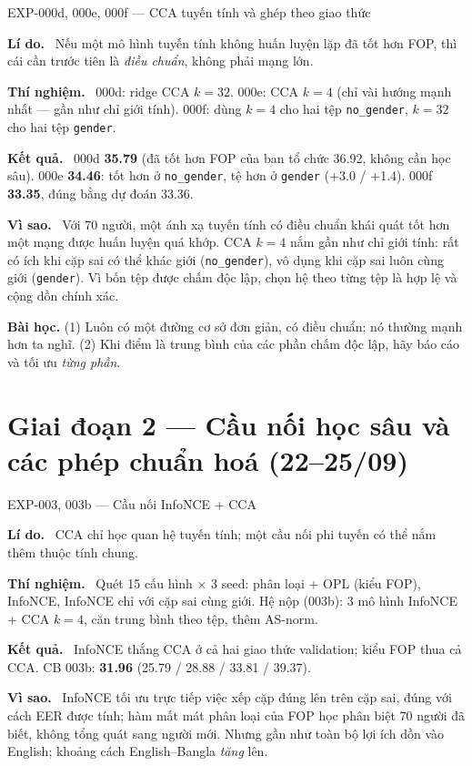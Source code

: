 \documentclass[11pt,a4paper,oneside]{report}
\newcommand{\up}[1]{\textbf{\color{good}#1}}
\newcommand{\id}[1]{\texttt{#1}}
\newcommand{\field}[1]{\par\smallskip\textbf{\color{accent}#1.}~}
\begin{document}
\begin{expbox}{EXP-000d, 000e, 000f --- CCA tuyến tính và ghép theo giao thức}
\field{Lí do} Nếu một mô hình tuyến tính không huấn luyện lặp đã tốt hơn FOP, thì cái cần trước tiên là \emph{điều chuẩn}, không phải mạng lớn.
\field{Thí nghiệm} 000d: ridge CCA $k=32$. 000e: CCA $k=4$ (chỉ vài hướng mạnh nhất --- gần như chỉ giới tính). 000f: dùng $k=4$ cho hai tệp \id{no\_gender}, $k=32$ cho hai tệp \id{gender}.
\field{Kết quả} 000d \up{35.79} (đã tốt hơn FOP của ban tổ chức 36.92, không cần học sâu). 000e \up{34.46}: tốt hơn ở \id{no\_gender}, tệ hơn ở \id{gender} (+3.0 / +1.4). 000f \up{33.35}, đúng bằng dự đoán 33.36.
\field{Vì sao} Với 70 người, một ánh xạ tuyến tính có điều chuẩn khái quát tốt hơn một mạng được huấn luyện quá khớp. CCA $k=4$ nắm gần như chỉ giới tính: rất có ích khi cặp sai có thể khác giới (\id{no\_gender}), vô dụng khi cặp sai luôn cùng giới (\id{gender}). Vì bốn tệp được chấm độc lập, chọn hệ theo từng tệp là hợp lệ và cộng dồn chính xác.
\end{expbox}

\begin{lesson}
\textbf{Bài học.} (1) Luôn có một đường cơ sở đơn giản, có điều chuẩn; nó thường mạnh hơn ta nghĩ. (2) Khi điểm là trung bình của các phần chấm độc lập, hãy báo cáo và tối ưu \emph{từng phần}.
\end{lesson}

\section{Giai đoạn 2 --- Cầu nối học sâu và các phép chuẩn hoá (22--25/09)}
\label{sec:p2}

\begin{expbox}{EXP-003, 003b --- Cầu nối InfoNCE + CCA}
\field{Lí do} CCA chỉ học quan hệ tuyến tính; một cầu nối phi tuyến có thể nắm thêm thuộc tính chung.
\field{Thí nghiệm} Quét 15 cấu hình $\times$ 3 seed: phân loại + OPL (kiểu FOP), InfoNCE, InfoNCE chỉ với cặp sai cùng giới. Hệ nộp (003b): 3 mô hình InfoNCE + CCA $k=4$, căn trung bình theo tệp, thêm AS-norm.
\field{Kết quả} InfoNCE thắng CCA ở cả hai giao thức validation; kiểu FOP thua cả CCA. CB 003b: \up{31.96} (25.79 / 28.88 / 33.81 / 39.37).
\field{Vì sao} InfoNCE tối ưu trực tiếp việc xếp cặp đúng lên trên cặp sai, đúng với cách EER được tính; hàm mất mát phân loại của FOP học phân biệt 70 người đã biết, không tổng quát sang người mới. Nhưng gần như toàn bộ lợi ích dồn vào English; khoảng cách English--Bangla \emph{tăng} lên.
\end{expbox}
\end{document}
